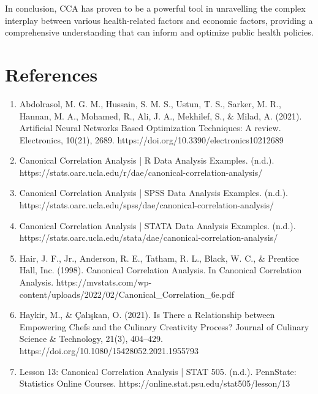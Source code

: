 \documentclass[11pt]{article}
\begin{document}
		In conclusion, CCA has proven to be a powerful tool in unravelling the complex interplay between various health-related factors and economic factors, providing a comprehensive understanding that can inform and optimize public health policies.
			
	
	\section{References}
		\begin{enumerate}
			\item Abdolrasol, M. G. M., Hussain, S. M. S., Ustun, T. S., Sarker, M. R., Hannan, M. A., Mohamed, R., Ali, J. A., Mekhilef, S., \& Milad, A. (2021). Artificial Neural Networks Based Optimization Techniques: A review. Electronics, 10(21), 2689. https://doi.org/10.3390/electronics10212689 
			
			\item Canonical Correlation Analysis | R Data Analysis Examples. (n.d.). \\ https://stats.oarc.ucla.edu/r/dae/canonical-correlation-analysis/ 
			
			\item Canonical Correlation Analysis | SPSS Data Analysis Examples. (n.d.). \\
			https://stats.oarc.ucla.edu/spss/dae/canonical-correlation-analysis/ 
			
			\item Canonical Correlation Analysis | STATA Data Analysis Examples. (n.d.). \\
			https://stats.oarc.ucla.edu/stata/dae/canonical-correlation-analysis/ 
			
			\item Hair, J. F., Jr., Anderson, R. E., Tatham, R. L., Black, W. C., \& Prentice Hall, Inc. (1998). Canonical Correlation Analysis. In Canonical Correlation Analysis. https://mvstats.com/wp-content/uploads/2022/02/Canonical\_Correlation\_6e.pdf 
			
			\item Haykir, M., \& Çalışkan, O. (2021). Is There a Relationship between Empowering Chefs and the Culinary Creativity Process? Journal of Culinary Science \& Technology, 21(3), 404–429. https://doi.org/10.1080/15428052.2021.1955793 
			
			\item Lesson 13: Canonical Correlation Analysis | STAT 505. (n.d.). PennState: Statistics Online Courses. https://online.stat.psu.edu/stat505/lesson/13
		\end{enumerate}
	
\end{document}
